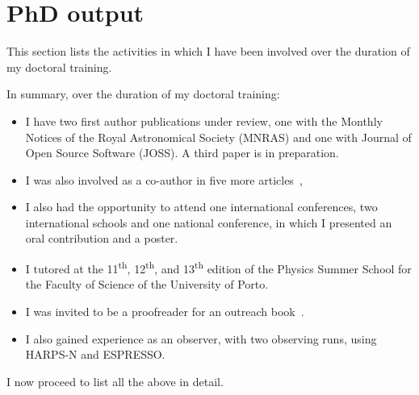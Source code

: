 \chapter{PhD output}\label{app:phd_output}

This section lists the activities in which I have been involved over the duration of my doctoral training.

In summary, over the duration of my doctoral training:
\begin{itemize}
    \item I have two first author publications under review, one with the Monthly Notices of the Royal Astronomical Society (MNRAS) and one with Journal of Open Source Software (JOSS). A third paper is in preparation. 
    \item I was also involved as a co-author in five more articles~\citep{figueira_radial_2016, barros_precise_2017, santerne_earthsized_2018, lillo-box_troy_2018, ulmer-moll_telluric_2018},
    \item I also had the opportunity to attend one international conferences, two international schools and one national conference, in which I presented an oral contribution and a  poster.
    \item I tutored at the 11\textsuperscript{th}, 12\textsuperscript{th}, and 13\textsuperscript{th} edition of the Physics Summer School for the Faculty of Science of the University of Porto.
    \item I was invited to be a proofreader for an outreach book~\citet{figueira_astro_2015}.
    \item I also gained experience as an observer, with two observing runs, using HARPS-N and ESPRESSO.
\end{itemize}

I now proceed to list all the above in detail.

\clearpage


\clearpage


\clearpage


\clearpage


\clearpage


\clearpage


\clearpage
